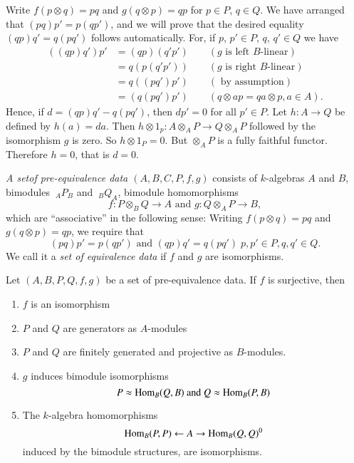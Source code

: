 Write $f(p \otimes q) = pq $ and $g(q \otimes p) = q p $ for $p \in
P$, $q \in Q$. We have arranged that $(pq)p' = p(qp')$, and we will
prove that the desired equality $(qp)q' = q(pq')$ follows
automatically. For, if $p$, $p' \in P$, $q$, $q' \in Q$ we have  
\begin{align*}
((qp)q')p' & = (qp) (q'p') \qquad (g \text{ is left $B$-linear})\\
& = q(p(q'p'))\qquad (g \text{ is right $B$-linear})\\
& = q((pq')p')\qquad (\text{ by assumption})\\
& = (q(pq')p')\qquad (q \otimes a p = qa \otimes p, a \in A).
\end{align*}
Hence, if $d = (qp) q' - q (pq')$, then $dp'=0$ for all $p' \in
P$. Let $h : A \to Q$ be defined by $h(a) = da$. Then $h \otimes 1_p :
A \otimes_A P \to Q \otimes _A P$ followed by the isomorphism $g$ is
zero. So $h \otimes 1_P = 0$. But $\otimes _A P$ is a fully faithful
functor. Therefore $h = 0$, that is $d = 0$.  

\setcounter{definition}{1}
\begin{definition}\label{chap2:def4.2}%
{\em A set\pageoriginale of pre-equivalence data $(A, B, C, P, f,
  g)$}
 consists of $k$-algebras $A$ and $B$, bimodules $~_A P_B$ and
 $~_BQ_A$, bimodule homomorphisms   
$$
f : P \otimes_B Q \to A \text{ and } g: Q \otimes_A P \to B, 
$$
which are ``associative'' in the following sense: Writing $f(p \otimes
q) = pq$ and $g(q \otimes p) = qp$, we require that   
$$
(pq)p' = p (qp') \text{ and } (qp)q' = q (pq') \; p, p' \in P, q, q'
\in Q. 
$$
We call it a {\em set of equivalence data} if $f$ and $g$ are isomorphisms. 
\end{definition}

\setcounter{theorem}{2}
\begin{theorem}\label{chap2:thm4.3}%
Let $(A, B, P, Q, f, g)$ be a set of pre-equivalence data. If $f$ is
surjective, then  
\begin{enumerate}[(1)]
\item $f$ is an isomorphism 

\item $P$ and $Q$ are generators as $A$-modules 

\item $P$ and $Q$ are finitely generated and projective as $B$-modules. 

\item $g$ induces bimodule isomorphisms 
$$
P \approx \operatorname{Hom}_B (Q, B) \text{ and } Q \approx \operatorname{Hom}_B(P, B)
$$

\item The $k$-algebra homomorphisms 
$$
\operatorname{Hom}_B (P, P) \leftarrow A \to \operatorname{Hom}_B (Q, Q)^0
$$
induced by the bimodule structures, are isomorphisms. 
\end{enumerate}
\end{theorem}

